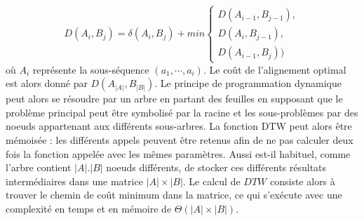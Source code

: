 $$
D(A_i, B_j) = \delta(A_i,B_j) + min
				\begin{cases}
				D( A_{i-1}, B_{j-1}), \\
				D( A_{i}, B_{j-1}), \\
				D( A_{i-1}, B_{j}))
				\end{cases}
$$
o\`u $A_i$ repr\'esente la sous-s\'equence $(a_1, \cdots, a_i)$. 
Le co\^ut de l'alignement optimal est alors donn\'e par
$ D(A_{|A|}, B_{|B|})$.
Le principe de programmation dynamique peut alors se r\'esoudre par un arbre en partant des
feuilles en supposant que le probl\`eme principal peut \^etre symbolis\'e par la racine et les sous-probl\`emes par des noeuds appartenant aux diff\'erents sous-arbres.
La fonction DTW peut alors \^etre m\'emois\'ee : les diff\'erents appels peuvent \^etre retenus afin de ne pas calculer deux fois la fonction appel\'ee avec les m\^emes param\`etres. 
Aussi est-il habituel, comme l'arbre contient
$| A | . | B |$ noeuds diff\'erents, de stocker ces diff\'erents r\'esultats interm\'ediaires dans une matrice $|A| \times | B |$.
Le calcul de $DTW$ consiste alors \`a trouver le chemin de co\^ut minimum dans la matrice, ce qui s'ex\'ecute avec une complexit\'e en temps et en m\'emoire de $\Theta(|A| \times |B|)$.
